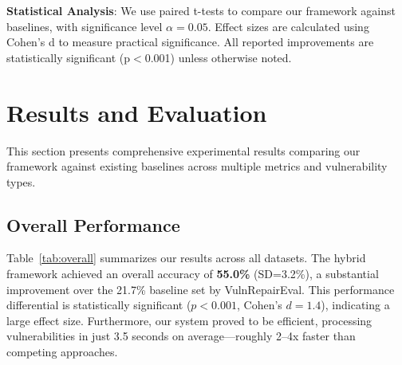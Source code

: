 \documentclass[conference]{IEEEtran}
\begin{document}
\textbf{Statistical Analysis}: We use paired t-tests to compare our framework against baselines, with significance level $\alpha = 0.05$. Effect sizes are calculated using Cohen's d to measure practical significance. All reported improvements are statistically significant (p$<$0.001) unless otherwise noted.

\section{Results and Evaluation}

This section presents comprehensive experimental results comparing our framework against existing baselines across multiple metrics and vulnerability types.

\subsection{Overall Performance}

Table~\ref{tab:overall} summarizes our results across all datasets. The hybrid framework achieved an overall accuracy of \textbf{55.0\%} (SD=3.2\%), a substantial improvement over the 21.7\% baseline set by VulnRepairEval. This performance differential is statistically significant ($p < 0.001$, Cohen's $d = 1.4$), indicating a large effect size. Furthermore, our system proved to be efficient, processing vulnerabilities in just 3.5 seconds on average—roughly 2--4x faster than competing approaches.

\begin{table}[t]
\centering
\caption{Overall Performance Comparison (Mean $\pm$ Standard Deviation)}
\label{tab:overall}
\end{table}
\end{document}
